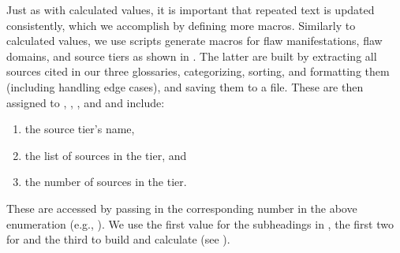 \label{text-macros}
Just as with calculated values, it is important that repeated text is updated
consistently, which we accomplish by defining more macros. Similarly to
calculated values, we use scripts generate macros for flaw manifestations,
flaw domains, and source tiers as shown in
. The latter are built by extracting all
sources cited in our three glossaries, categorizing, sorting, and formatting
them (including handling edge cases), and saving them to a file. These are then
assigned to , , , and
 and include:
\begin{enumerate}
    \item the source tier's name,
    \item the list of sources in the tier, and
    \item the number of sources in the tier.
\end{enumerate}
These are accessed by passing in the corresponding number in the above
enumeration (e.g., ). We use the first value for the
subheadings in , the first two for  and
the third to build  and calculate 
(see ).


\begin{landscape}
    
\end{landscape}
% 
